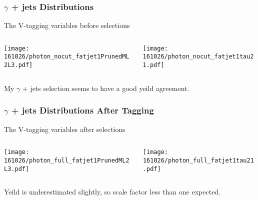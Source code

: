\documentclass{beamer}
\begin{document}
\begin{frame}
  \frametitle{$\gamma$ + jets Distributions}
  The V-tagging variables before selections
  \begin{columns}
    \begin{column}{0.5\linewidth}
      \centering
      \texttt{[image: 161026/photon\_nocut\_fatjet1PrunedML2L3.pdf]}
    \end{column}
    \begin{column}{0.5\linewidth}
      \centering
      \texttt{[image: 161026/photon\_nocut\_fatjet1tau21.pdf]}
    \end{column}
  \end{columns}
  My $\gamma$ + jets selection seems to have a good yeild agreement.
\end{frame}

\begin{frame}
  \frametitle{$\gamma$ + jets Distributions After Tagging}
  The V-tagging variables after selections
  \begin{columns}
    \begin{column}{0.5\linewidth}
      \centering
      \texttt{[image: 161026/photon\_full\_fatjet1PrunedML2L3.pdf]}
    \end{column}
    \begin{column}{0.5\linewidth}
      \centering
      \texttt{[image: 161026/photon\_full\_fatjet1tau21.pdf]}
    \end{column}
  \end{columns}
  Yeild is underestimated slightly, so scale factor less than one expected.
\end{frame}
\end{document}
